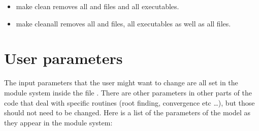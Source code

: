 \documentclass[letterpaper,10pt,english]{sphinxmanual}
\begin{document}
\begin{itemize}
\begin{sphinxVerbatim}[commandchars=\\\{\}]
    make clean make parspace mpirun \PYGZhy{}n NUMBER\PYGZus{}OF\PYGZus{}PROCESSES ./XNS\PYGZhy{}mpi
\end{sphinxVerbatim}

\sphinxAtStartPar
Note that it must be NUMBER\_OF\_PROCESSES\(\geq\)2, because one process is always only passing initial conditions to the other processes, and NUMBER\_OF\_PROCESSES\sphinxhyphen{}1\(\leq\)(NOMG+1)\(\times\)(NRHO1+1)\(\times\)(NKB+1), that is the number of computing processes must not be larger than the number of models to be computed.


\item {} 
\sphinxAtStartPar
make clean \sphinxhyphen{} removes all  and  files and all executables.


\item {} 
\sphinxAtStartPar
make cleanall \sphinxhyphen{} removes all  and  files, all executables as well as all  files.

\end{itemize}


\chapter{User parameters}
\label{\detokenize{user_params:user-parameters}}\label{\detokenize{user_params::doc}}
\sphinxAtStartPar
The input parameters that the user might want to change are all set in the module system inside the file . There are other parameters in other parts of the code that deal with specific routines (root finding, convergence etc …), but those should not need to be changed. Here is a list of the parameters of the model as they appear in the module system:
\end{document}
